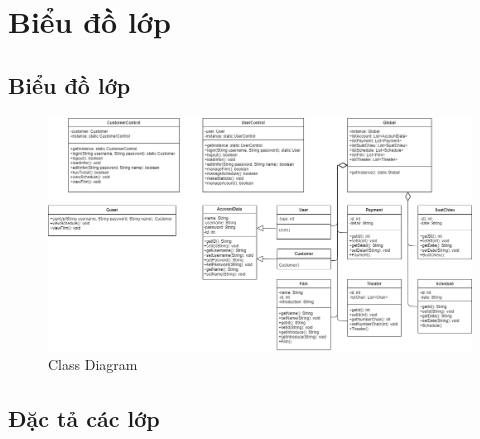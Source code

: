 \documentclass[a4paper, 12pt]{article}
\begin{document}
\section{Biểu đồ lớp}

\subsection{Biểu đồ lớp}

\begin{figure}[H]
	\begin{center}
		\includegraphics[angle=90,scale=0.49]{image/5.0.png}
		\caption{Class Diagram}
	\end{center}
\end{figure}

\subsection{Đặc tả các lớp}
\end{document}
